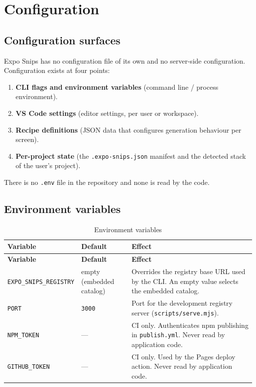 \chapter{Configuration}
\label{ch:configuration}

\section{Configuration surfaces}

Expo Snips has no configuration file of its own and no server-side
configuration. Configuration exists at four points:

\begin{enumerate}
  \item \textbf{CLI flags and environment variables} (command line / process
        environment).
  \item \textbf{VS Code settings} (editor settings, per user or workspace).
  \item \textbf{Recipe definitions} (JSON data that configures generation
        behaviour per screen).
  \item \textbf{Per-project state} (the \texttt{.expo-snips.json} manifest and
        the detected stack of the user's project).
\end{enumerate}

There is no \texttt{.env} file in the repository and none is read by the code.

\section{Environment variables}

\begin{longtable}{@{}L{4.4cm}L{2.2cm}L{7.6cm}@{}}
\caption{Environment variables}\\
\toprule
\textbf{Variable} & \textbf{Default} & \textbf{Effect} \\
\midrule
\endfirsthead
\toprule
\textbf{Variable} & \textbf{Default} & \textbf{Effect} \\
\midrule
\endhead
\texttt{EXPO\_SNIPS\_REGISTRY} & empty (embedded catalog) & Overrides the
registry base URL used by the CLI. An empty value selects the embedded catalog. \\
\texttt{PORT} & \texttt{3000} & Port for the development registry server
(\texttt{scripts/serve.mjs}). \\
\texttt{NPM\_TOKEN} & --- & CI only. Authenticates npm publishing in
\texttt{publish.yml}. Never read by application code. \\
\texttt{GITHUB\_TOKEN} & --- & CI only. Used by the Pages deploy action. Never
read by application code. \\
\bottomrule
\end{longtable}

